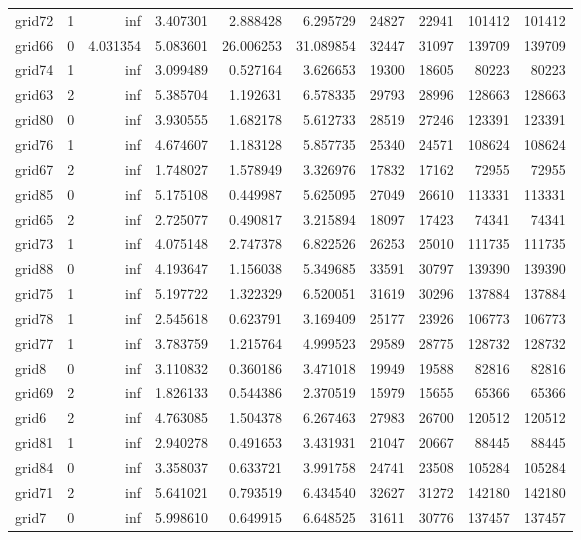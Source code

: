 \begin{longtable}{|l|r|r|r|r|r|r|r|r|r|}
grid72 & 1 & inf & 3.407301 & 2.888428 & 6.295729 & 24827 & 22941 & 101412 & 101412 \\
grid66 & 0 & 4.031354 & 5.083601 & 26.006253 & 31.089854 & 32447 & 31097 & 139709 & 139709 \\
grid74 & 1 & inf & 3.099489 & 0.527164 & 3.626653 & 19300 & 18605 & 80223 & 80223 \\
grid63 & 2 & inf & 5.385704 & 1.192631 & 6.578335 & 29793 & 28996 & 128663 & 128663 \\
grid80 & 0 & inf & 3.930555 & 1.682178 & 5.612733 & 28519 & 27246 & 123391 & 123391 \\
grid76 & 1 & inf & 4.674607 & 1.183128 & 5.857735 & 25340 & 24571 & 108624 & 108624 \\
grid67 & 2 & inf & 1.748027 & 1.578949 & 3.326976 & 17832 & 17162 & 72955 & 72955 \\
grid85 & 0 & inf & 5.175108 & 0.449987 & 5.625095 & 27049 & 26610 & 113331 & 113331 \\
grid65 & 2 & inf & 2.725077 & 0.490817 & 3.215894 & 18097 & 17423 & 74341 & 74341 \\
grid73 & 1 & inf & 4.075148 & 2.747378 & 6.822526 & 26253 & 25010 & 111735 & 111735 \\
grid88 & 0 & inf & 4.193647 & 1.156038 & 5.349685 & 33591 & 30797 & 139390 & 139390 \\
grid75 & 1 & inf & 5.197722 & 1.322329 & 6.520051 & 31619 & 30296 & 137884 & 137884 \\
grid78 & 1 & inf & 2.545618 & 0.623791 & 3.169409 & 25177 & 23926 & 106773 & 106773 \\
grid77 & 1 & inf & 3.783759 & 1.215764 & 4.999523 & 29589 & 28775 & 128732 & 128732 \\
grid8 & 0 & inf & 3.110832 & 0.360186 & 3.471018 & 19949 & 19588 & 82816 & 82816 \\
grid69 & 2 & inf & 1.826133 & 0.544386 & 2.370519 & 15979 & 15655 & 65366 & 65366 \\
grid6 & 2 & inf & 4.763085 & 1.504378 & 6.267463 & 27983 & 26700 & 120512 & 120512 \\
grid81 & 1 & inf & 2.940278 & 0.491653 & 3.431931 & 21047 & 20667 & 88445 & 88445 \\
grid84 & 0 & inf & 3.358037 & 0.633721 & 3.991758 & 24741 & 23508 & 105284 & 105284 \\
grid71 & 2 & inf & 5.641021 & 0.793519 & 6.434540 & 32627 & 31272 & 142180 & 142180 \\
grid7 & 0 & inf & 5.998610 & 0.649915 & 6.648525 & 31611 & 30776 & 137457 & 137457 \\

\end{longtable}

